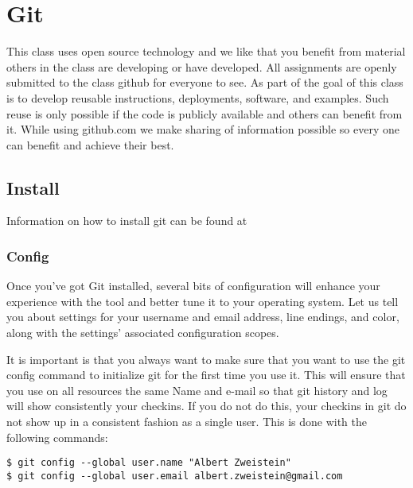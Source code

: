 \section{Git}\label{git}

This class uses open source technology and we like that you benefit from
material others in the class are developing or have developed. All
assignments are openly submitted to the class github for everyone to
see. As part of the goal of this class is to develop reusable
instructions, deployments, software, and examples. Such reuse is only
possible if the code is publicly available and others can benefit from
it. While using github.com we make sharing of information possible so
every one can benefit and achieve their best.

\subsection{Install}\label{install}

Information on how to install git can be found at


\subsubsection{Config}\label{config}

Once you've got Git installed, several bits of configuration will
enhance your experience with the tool and better tune it to your
operating system. Let us tell you about settings for your username and
email address, line endings, and color, along with the settings'
associated configuration scopes.


It is important is that you always want to make sure that you want to
use the git config command to initialize git for the first time you use
it. This will ensure that you use on all resources the same Name and
e-mail so that git history and log will show consistently your checkins.
If you do not do this, your checkins in git do not show up in a
consistent fashion as a single user. This is done with the following
commands:

\begin{verbatim}
$ git config --global user.name "Albert Zweistein"
$ git config --global user.email albert.zweistein@gmail.com
\end{verbatim}

